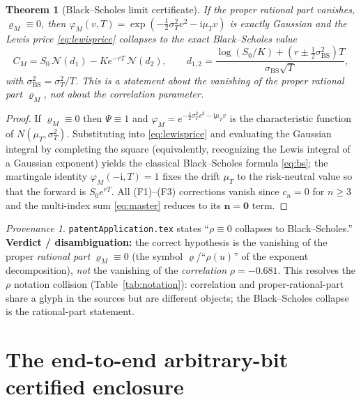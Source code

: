 \documentclass[11pt]{article}
\newcommand{\Ii}{\mathrm{i}}
\theoremstyle{plain}
\newtheorem{theorem}{Theorem}[section]
\theoremstyle{definition}
\theoremstyle{remark}
\newtheorem*{provenance}{Provenance}
\begin{document}
\begin{theorem}[Black--Scholes limit certificate]\label{thm:bs}
If the proper rational part vanishes, $\varrho_M\equiv0$, then
$\varphi_M(v,T)=\exp(-\tfrac12\sigma_T^2v^2-\Ii\mu_Tv)$ is exactly Gaussian and the
Lewis price \eqref{eq:lewisprice} collapses to the exact Black--Scholes value
\begin{equation}\label{eq:bs}
   C_M=S_0\,\mathcal N(d_1)-Ke^{-rT}\,\mathcal N(d_2),\qquad
   d_{1,2}=\frac{\log(S_0/K)+(r\pm\tfrac12\sigma_{\mathrm{BS}}^2)T}
                {\sigma_{\mathrm{BS}}\sqrt T},
\end{equation}
with $\sigma_{\mathrm{BS}}^2=\sigma_T^2/T$. This is a statement about the vanishing
of the \emph{proper rational part} $\varrho_M$, not about the correlation parameter.
\end{theorem}
\begin{proof}
If $\varrho_M\equiv0$ then $\Psi\equiv1$ and $\varphi_M=e^{-\frac12\sigma_T^2v^2
-\Ii\mu_Tv}$ is the characteristic function of $N(\mu_T,\sigma_T^2)$. Substituting
into \eqref{eq:lewisprice} and evaluating the Gaussian integral by completing the
square (equivalently, recognizing the Lewis integral of a Gaussian exponent) yields
the classical Black--Scholes formula \eqref{eq:bs}; the martingale identity
$\varphi_M(-\Ii,T)=1$ fixes the drift $\mu_T$ to the risk-neutral value so that the
forward is $S_0e^{rT}$. All \textup{(F1)}--\textup{(F3)} corrections vanish since
$c_n=0$ for $n\ge3$ and the multi-index sum \eqref{eq:master} reduces to its
$\mathbf n=\mathbf 0$ term.
\end{proof}
\begin{provenance}
\texttt{patentApplication.tex} states ``$\rho\equiv0$ collapses to Black--Scholes.''
\textbf{Verdict / disambiguation:} the correct hypothesis is the vanishing of the
proper \emph{rational part} $\varrho_M\equiv0$ (the symbol $\varrho$/``$\rho(u)$'' of
the exponent decomposition), \emph{not} the vanishing of the \emph{correlation}
$\rho=-0.681$. This resolves the $\rho$ notation collision
(Table~\ref{tab:notation}): correlation and proper-rational-part share a glyph in
the sources but are different objects; the Black--Scholes collapse is the
rational-part statement.
\end{provenance}

\section{The end-to-end arbitrary-bit certified enclosure}
\label{sec:bits}
\end{document}
